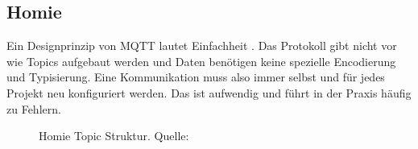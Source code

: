 \subsection{Homie}
\label{subs:homie}

Ein Designprinzip von MQTT lautet Einfachheit \cite{mqtt-design-principles}. 
Das Protokoll gibt nicht vor wie Topics aufgebaut werden und Daten benötigen keine spezielle
Encodierung und Typisierung. Eine Kommunikation muss also immer selbst und
für jedes Projekt neu konfiguriert werden. Das ist aufwendig und führt in der 
Praxis häufig zu Fehlern.\\

\begin{figure}
  
  \caption{Homie Topic Struktur. Quelle: \cite{homie}}
  \label{fig:homie-example}
\end{figure}

